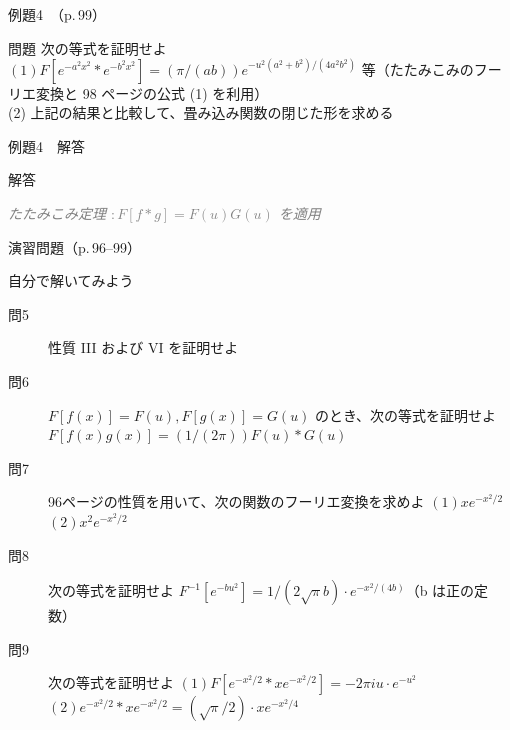 \documentclass[aspectratio=43,professionalfonts,handout]{beamer}
\begin{document}
\begin{frame}{例題4　（p.\,99）}
  \begin{exampleblock}{問題}
    次の等式を証明せよ\\[2pt]
    $(1) F[e^{-a^{2}x^{2}} * e^{-b^{2}x^{2}}] = (\pi/(ab)) e^{-u^{2}(a^{2}+b^{2})/(4a^{2}b^{2})}$ 等（たたみこみのフーリエ変換と 98 ページの公式 (1) を利用）\\[2pt]
    (2) 上記の結果と比較して、畳み込み関数の閉じた形を求める\\[2pt]
  \end{exampleblock}
\end{frame}

\begin{frame}{例題4　解答}
  \begin{exampleblock}{解答}
  \end{exampleblock}
  {\footnotesize \textcolor{gray}{\textit{たたみこみ定理 $: F[f*g] = F(u)G(u)$ を適用}}}
\end{frame}

\begin{frame}{演習問題（p.\,96--99）}
  \begin{exampleblock}{自分で解いてみよう}
  \begin{description}
    \item[問5] 性質 III および VI を証明せよ
    \item[問6] $F[f(x)] = F(u), F[g(x)] = G(u)$ のとき、次の等式を証明せよ
    $F[f(x)g(x)] = (1/(2\pi)) F(u) * G(u)$\\
    \item[問7] 96ページの性質を用いて、次の関数のフーリエ変換を求めよ
    $(1) xe^{-x^{2}/2}$\\
    $(2) x^{2}e^{-x^{2}/2}$\\
    \item[問8] 次の等式を証明せよ
    $F^{-1}[e^{-bu^{2}}] = 1/(2\sqrt\pi b) \cdot e^{-x^{2}/(4b)}$（b は正の定数）\\
    \item[問9] 次の等式を証明せよ
    $(1) F[e^{-x^{2}/2} * xe^{-x^{2}/2}] = -2\pi iu\cdot e^{-u^{2}}$\\
    $(2) e^{-x^{2}/2} * xe^{-x^{2}/2} = (\sqrt\pi/2)\cdot xe^{-x^{2}/4}$\\
  \end{description}
  \end{exampleblock}
\end{frame}
\end{document}
